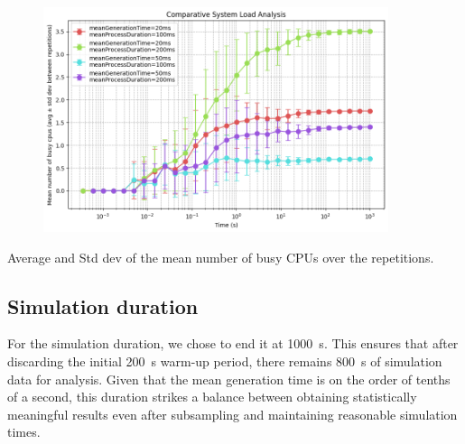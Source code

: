 \begin{figure}[H]
    \captionsetup{type=figure}
    \centering
    \includegraphics[width=0.9\textwidth]{./images/04/errorWarmup.png}
    \label{fig:errorWarmup}
\end{figure}


\begin{table}[H]
    \centering
    \scriptsize
    
    \caption{Average and Std dev of the mean number of busy CPUs over the repetitions.}
    \label{tab:stabilization}
\end{table}

\subsection{Simulation duration}

For the simulation duration, we chose to end it at \SI{1000}{\second}. This ensures that after discarding the initial \SI{200}{\second} warm-up period, there remains \SI{800}{\second} of simulation data for analysis. Given that the mean generation time is on the order of tenths of a second, this duration strikes a balance between obtaining statistically meaningful results even after subsampling and maintaining reasonable simulation times.
